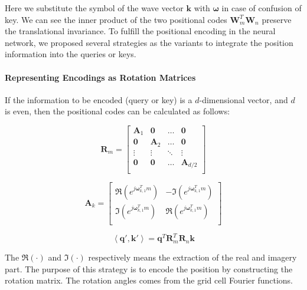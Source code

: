 \documentclass[letterpaper]{article} %
\begin{document}
Here we substitute the symbol of the wave vector $\boldsymbol{k}$ with $\boldsymbol{\omega}$ in case of confusion of key. We can see the inner product of the two positional codes $\boldsymbol{W}_m^T\boldsymbol{W}_n$ preserve the translational invariance. To fulfill the positional encoding in the neural network, we proposed several strategies as the variants to integrate the position information into the queries or keys.

\paragraph{Representing Encodings as Rotation Matrices} If the information to be encoded (query or key) is a \(d\)-dimensional vector, and \(d\) is even, then the positional codes can be calculated as follows:

\begin{equation}
\boldsymbol{R}_m = 
\begin{bmatrix}
    \boldsymbol{A}_1 & \boldsymbol{0} & \dots & \boldsymbol{0} \\
    \boldsymbol{0} & \boldsymbol{A}_2 & \dots & \boldsymbol{0} \\
    \vdots & \vdots & \ddots & \vdots \\
    \boldsymbol{0} & \boldsymbol{0} & \dots & \boldsymbol{A}_{d/2} \\
\end{bmatrix}
\end{equation}
    
\begin{equation}
\boldsymbol{A}_k = 
\begin{bmatrix}
    \Re\left(e^{j \boldsymbol{\omega}_{k,1}^T m}\right) & -\Im\left(e^{j \boldsymbol{\omega}_{k,1}^T m}\right) \\
    \Im\left(e^{j \boldsymbol{\omega}_{k,1}^T m}\right) & \Re\left(e^{j \boldsymbol{\omega}_{k,1}^T m}\right) \\
\end{bmatrix}
\end{equation}

\begin{equation}
\left\langle \boldsymbol{q}', \boldsymbol{k}' \right\rangle = \boldsymbol{q}^T \boldsymbol{R}_m^T \boldsymbol{R}_n \boldsymbol{k}
\end{equation}
    
The $\Re(\cdot)$ and $\Im(\cdot)$ respectively means the extraction of the real and imagery part. The purpose of this strategy is to encode the position by constructing the rotation matrix. The rotation angles comes from the grid cell Fourier functions. 
\end{document}
